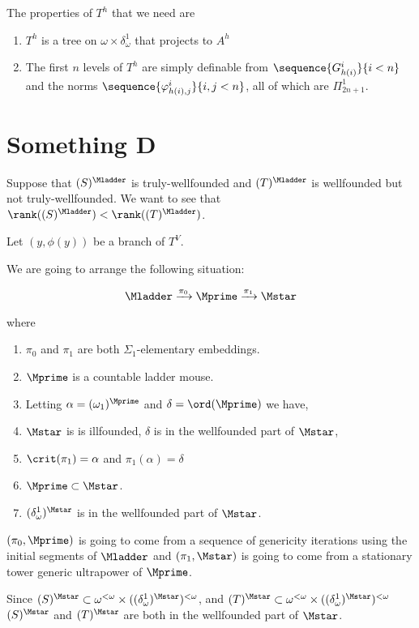 \documentclass[oneside,12pt]{amsart}
\begin{document}
The properties of $T^h$ that we need are
\begin{enumerate}
\item $T^h$ is a tree on $\omega\times\delta^1_{\omega}$ that projects to $A^h$
\item The first $n$ levels of $T^h$ are simply definable from $\sequence{G^i_{h(i)}}{i<n}$ and
the norms $\sequence{\varphi^i_{h(i), j}}{i,j<n}$, all of which are $\Pi^1_{2n+1}$.
\end{enumerate}

\section{Something D}
\label{section:somethingd}

Suppose that $(S)^{\Mladder}$ is truly-wellfounded and $(T)^{\Mladder}$ is
wellfounded but not truly-wellfounded. We want to see that
$\rank((S)^{\Mladder}) < \rank((T)^{\Mladder})$.

Let $(y,\phi(y))$ be a branch of $T^V$.


We are going to arrange the following situation:

\begin{equation}
\label{big-setup}
\Mladder \xrightarrow{\pi_0} \Mprime \xrightarrow{\pi_1} \Mstar
\end{equation}

where

\begin{enumerate}
\item $\pi_0$ and $\pi_1$ are both $\Sigma_1$-elementary embeddings.
\item $\Mprime$ is a countable ladder mouse.
\item Letting $\alpha=(\omega_1)^{\Mprime}$ and $\delta=\ord(\Mprime)$ we have,
\item $\Mstar$ is is illfounded, $\delta$ is in the wellfounded part of $\Mstar$,
\item $\crit(\pi_1) = \alpha$ and $\pi_1(\alpha)=\delta$
\item $\Mprime \subset \Mstar$.
\item $(\delta^1_\omega)^{\Mstar}$ is in the wellfounded part of $\Mstar$.
\end{enumerate}

$(\pi_0, \Mprime)$ is going to come from a sequence of genericity iterations using
the initial segments of $\Mladder$ and $(\pi_1,\Mstar)$
is going to come from a stationary tower generic ultrapower of $\Mprime$.

Since $(S)^{\Mstar} \subset \omega^{<\omega}\times ((\delta^1_\omega)^{\Mstar})^{<\omega}$,
and
$(T)^{\Mstar} \subset \omega^{<\omega}\times ((\delta^1_\omega)^{\Mstar})^{<\omega}$
$(S)^{\Mstar}$ and $(T)^{\Mstar}$ are both in the wellfounded part of $\Mstar$.
\end{document}

